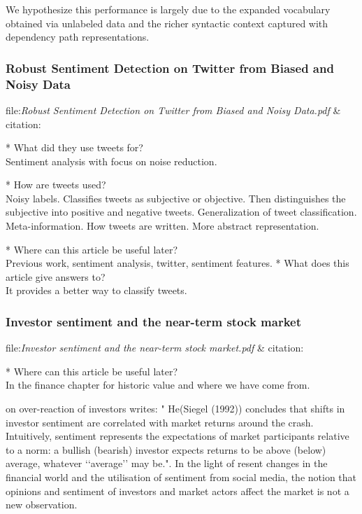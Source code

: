 We hypothesize this performance is largely due to the expanded vocabulary obtained via unlabeled data and the richer syntactic context captured with dependency path representations. \cite[]{becker13}


\subsubsection{Robust Sentiment Detection on Twitter from Biased and Noisy Data}
file:\textit{Robust Sentiment Detection on Twitter from Biased and Noisy
Data.pdf} & citation:\cite[]{barbosa10}

* What did they use tweets for?\\
Sentiment analysis with focus on noise reduction. 

* How are tweets used?\\
Noisy labels. Classifies tweets as subjective or objective. Then distinguishes
the subjective into positive and negative tweets.  
Generalization of tweet classification. Meta-information. How tweets are
written. More abstract representation.

* Where can this article be useful later? \\
Previous work, sentiment analysis, twitter, sentiment features. 
* What does this article give answers to?\\
It provides a better way to classify tweets. 

\subsubsection{Investor sentiment and the near-term stock market}
file:\textit{Investor sentiment and the near-term stock market.pdf} & citation:\cite[]{Brown20041}

* Where can this article be useful later? \\
In the finance chapter for historic value and where we have come from. 

\cite[p2]{brown20041} on over-reaction of investors writes: "
He(Siegel (1992)) concludes that shifts in investor sentiment are correlated with market
returns around the crash. Intuitively, sentiment represents the expectations of market participants
relative to a norm: a bullish (bearish) investor expects returns to be above
(below) average, whatever ‘‘average’’ may be.". In the light of resent changes
in the financial world and the utilisation of sentiment from social media, the
notion that opinions and sentiment of investors and market actors affect the
market is not a new observation. 

